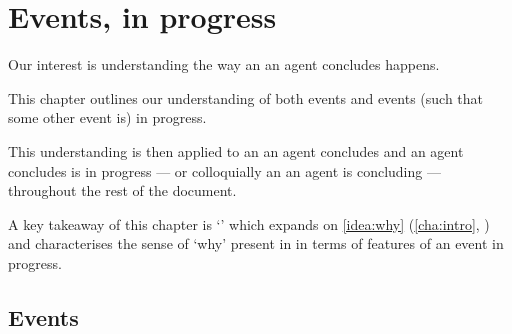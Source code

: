 \chapter{Events, in progress}
\label{cha:events-progress}


\begin{note}
  Our interest is understanding the way an  an agent concludes happens.

  This chapter outlines our understanding of both events and events (such that some other event is) in progress.
  
  This understanding is then applied to an  an agent concludes and  an agent concludes is in progress --- or colloquially an  an agent is concluding --- throughout the rest of the document.

  A key takeaway of this chapter is `\progEx{}' which expands on \autoref{idea:why} (\autoref{cha:intro}, ) and characterises the sense of `why' present in \qWhy{} in terms of features of an event in progress.
\end{note}


\section{Events}
\label{sec:events}

